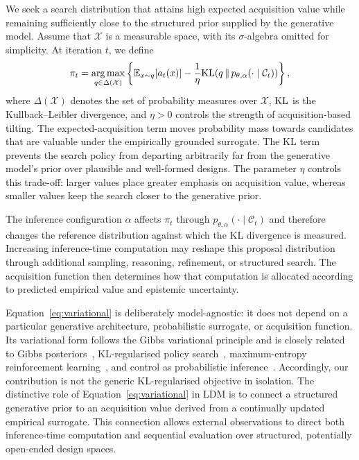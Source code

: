 
We seek a search distribution that attains high expected acquisition value
while remaining sufficiently close to the structured prior supplied by the
generative model. Assume that $\mathcal{X}$ is a measurable space, with its
$\sigma$-algebra omitted for simplicity. At iteration $t$, we define
\begin{equation}
\label{eq:variational}
    \pi_t
    =
    \operatorname*{arg\,max}_{q\in\Delta(\mathcal{X})}
    \left\{
        \mathbb{E}_{x\sim q}\!\left[a_t(x)\right]
        -
        \frac{1}{\eta}
        \mathrm{KL}\!\left(
            q
            \,\middle\|\,
            p_{\theta,\alpha}(\cdot\mid\mathcal{C}_t)
        \right)
    \right\},
\end{equation}
where $\Delta(\mathcal{X})$ denotes the set of probability measures over
$\mathcal{X}$, $\mathrm{KL}$ is the Kullback--Leibler divergence, and $\eta>0$ controls
the strength of acquisition-based tilting. The expected-acquisition term moves
probability mass towards candidates that are valuable under the empirically
grounded surrogate. The KL term prevents the search policy from departing
arbitrarily far from the generative model's prior over plausible and
well-formed designs. The parameter $\eta$ controls this trade-off: larger
values place greater emphasis on acquisition value, whereas smaller values
keep the search closer to the generative prior.

The inference configuration $\alpha$ affects $\pi_t$ through
$p_{\theta,\alpha}(\cdot\mid\mathcal{C}_t)$ and therefore changes the reference
distribution against which the KL divergence is measured. Increasing
inference-time computation may reshape this proposal distribution through
additional sampling, reasoning, refinement, or structured search. The
acquisition function then determines how that computation is allocated
according to predicted empirical value and epistemic uncertainty.

Equation~\eqref{eq:variational} is deliberately model-agnostic: it does not
depend on a particular generative architecture, probabilistic surrogate, or
acquisition function. Its variational form follows the Gibbs variational principle and is closely
related to Gibbs posteriors~\citep{donsker1975variational,bissiri2016general},
KL-regularised policy search~\citep{peters2010relative},
maximum-entropy reinforcement learning~\citep{haarnoja2018soft}, and control as
probabilistic inference~\citep{levine2018reinforcement}. Accordingly, our contribution is not the generic
KL-regularised objective in isolation. The distinctive role of
Equation~\eqref{eq:variational} in LDM is to connect a structured generative
prior to an acquisition value derived from a continually updated empirical
surrogate. This connection allows external observations to direct both
inference-time computation and sequential evaluation over structured,
potentially open-ended design spaces.

